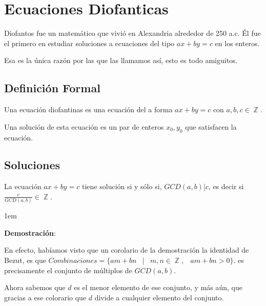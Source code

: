 \documentclass[12pt, fleqn]{report}                             %
\newenvironment{SmallIndentation}[1][0.75em]                    %
    {\begin{adjustwidth}{#1}{}\begin{footnotesize}}                 %
    {\end{footnotesize}\end{adjustwidth}}                           %
\DeclareMathOperator \Space {\quad}                             %
\DeclareMathOperator \MiniSpace {\;}                            %
\newcommand \Such {\MiniSpace|\MiniSpace}                       %
\DeclareMathOperator \Integers  {\mathbb{Z}}                     %
\begin{document}
    \clearpage
    \section{Ecuaciones Diofanticas}

        Diofantos fue un matemático que vivió en Alexandria alrededor de 250 a.c.
        Él fue el primero en estudiar soluciones a ecuaciones del tipo $ax+by=c$ en los enteros.

        Esa es la única razón por las que las llamamos así, esto es todo amiguitos.


        \subsection*{Definición Formal}

            Una ecuación diofantinas es una ecuación del a forma $ax+by=c$ con
            $a,b,c \in \Integers$.

            Una solución de esta ecuación es un par de enteros $x_0, y_0$
            que satisfacen la ecuación.


        \subsection{Soluciones}

            La ecuación $ax+by = c$ tiene solución si y sólo si, $GCD(a,b)|c$, es decir
            si $\frac{c}{GCD(a,b)} \in \Integers$.

            \begin{SmallIndentation}[1em]
                \textbf{Demostración}:

                En efecto, habíamos visto que un corolario de la demostración la identidad
                de Bezut, es que
                $Combinaciones = \{ am+bn \Such m, n \in \Integers, \MiniSpace am+bn > 0 \}$.
                es precisamente el conjunto de múltiplos de $GCD(a,b)$.

                Ahora sabemos que $d$ es el menor elemento de ese conjunto, y más aún,
                que gracias a ese colorario que $d$ divide a cualquier elemento del conjunto.

            \end{SmallIndentation}
\end{document}
